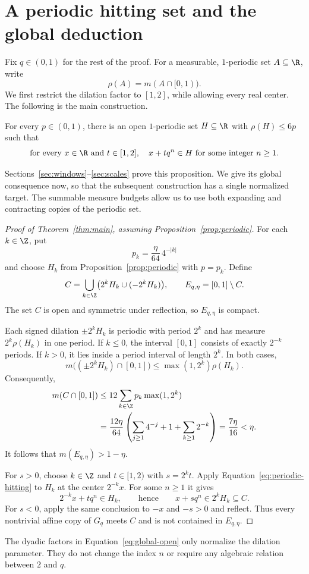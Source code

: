 \section{A periodic hitting set and the global deduction}
\label{sec:periodic}

Fix $q\in(0,1)$ for the rest of the proof. For a measurable,
$1$-periodic set $A\subseteq\R$, write
\[
 \rho(A)=m(A\cap[0,1)).
\]
We first restrict the dilation factor to $[1,2]$, while allowing every
real center. The following is the main construction.

\begin{proposition}\label{prop:periodic}
For every $p\in(0,1)$, there is an open $1$-periodic set $H\subseteq\R$
with $\rho(H)\le6p$ such that
\begin{equation}\label{eq:periodic-hitting}
 \text{for every }x\in\R\text{ and }t\in[1,2],
 \quad x+tq^n\in H\text{ for some integer }n\ge1.
\end{equation}
\end{proposition}

Sections~\ref{sec:windows}--\ref{sec:scales} prove this proposition.
We give its global consequence now, so that the subsequent construction
has a single normalized target. The summable measure budgets allow us
to use both expanding and contracting copies of the periodic set.

\begin{proof}[Proof of Theorem~\ref{thm:main}, assuming
Proposition~\ref{prop:periodic}]
For each $k\in\Z$, put
\[
 p_k=\frac{\eta}{64}\,4^{-|k|}
\]
and choose $H_k$ from Proposition~\ref{prop:periodic} with $p=p_k$.
Define
\begin{equation}\label{eq:global-open}
 C=\bigcup_{k\in\Z}\bigl(2^kH_k\cup(-2^kH_k)\bigr),
 \qquad E_{q,\eta}=[0,1]\setminus C.
\end{equation}
The set $C$ is open and symmetric under reflection, so $E_{q,\eta}$
is compact.

Each signed dilation $\pm2^kH_k$ is periodic with period $2^k$ and
has measure $2^k\rho(H_k)$ in one period. If $k\le0$, the interval
$[0,1]$ consists of exactly $2^{-k}$ periods. If $k>0$, it lies inside
a period interval of length $2^k$. In both cases,
\[
 m\bigl((\pm2^kH_k)\cap[0,1]\bigr)
 \le \max(1,2^k)\rho(H_k).
\]
Consequently,
\begin{align}
 m(C\cap[0,1])
 &\le12\sum_{k\in\Z}p_k\max(1,2^k)\notag\\
 &=\frac{12\eta}{64}
   \left(\sum_{j\ge1}4^{-j}+1+\sum_{k\ge1}2^{-k}\right)
 =\frac{7\eta}{16}<\eta.
 \label{eq:global-measure}
\end{align}
It follows that $m(E_{q,\eta})>1-\eta$.

For $s>0$, choose $k\in\Z$ and $t\in[1,2)$ with $s=2^kt$.
Apply Equation~\eqref{eq:periodic-hitting} to $H_k$ at the center
$2^{-k}x$. For some $n\ge1$ it gives
\[
 2^{-k}x+tq^n\in H_k,
 \qquad\text{hence}\qquad x+sq^n\in2^kH_k\subseteq C.
\]
For $s<0$, apply the same conclusion to $-x$ and $-s>0$ and reflect.
Thus every nontrivial affine copy of $G_q$ meets $C$ and is not
contained in $E_{q,\eta}$.
\end{proof}

The dyadic factors in Equation~\eqref{eq:global-open} only normalize
the dilation parameter. They do not change the index $n$ or require
any algebraic relation between $2$ and $q$.

